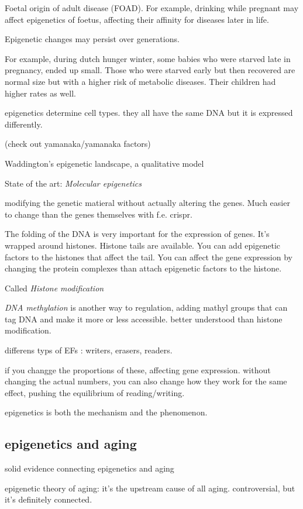 \documentclass{article}
\begin{document}
Foetal origin of adult disease (FOAD). For example, drinking while pregnant may affect epigenetics of foetus, affecting their affinity for diseases later in life. 

Epigenetic changes may persist over generations. 

For example, during dutch hunger winter, some babies who were starved late in pregnancy, ended up small. Those who were starved early but then recovered are normal size but with a higher risk of metabolic diseases. Their children had higher rates as well. 

epigenetics determine cell types. they all have the same DNA but it is expressed differently.

(check out yamanaka/yamanaka factors)


Waddington's epigenetic landscape, a qualitative model

State of the art: \textit{Molecular epigenetics}

modifying the genetic matieral without actually altering the genes. Much easier to change than the genes themselves with f.e. crispr. 


The folding of the DNA is very important for the expression of genes. It's wrapped around histones. Histone tails are available. You can add epigenetic factors to the histones that affect the tail. You can affect the gene expression by changing the protein complexes than attach epigenetic factors to the histone. 

Called \textit{Histone modification }

\textit{DNA methylation} is another way to regulation, adding mathyl groups that can tag DNA and make it more or less accessible. better understood than histone modification. 

differens typs of EFs : writers, erasers, readers. 

if you changge the proportions of these, affecting gene expression. without changing the actual numbers, you can also change how they work for the same effect, pushing the equilibrium of reading/writing.


epigenetics is both the mechanism and the phenomenon. 




\subsection{epigenetics and aging}
solid evidence connecting epigenetics and aging

epigenetic theory of aging: it's the upstream cause of all aging. controversial, but it's definitely connected. 
\end{document}
